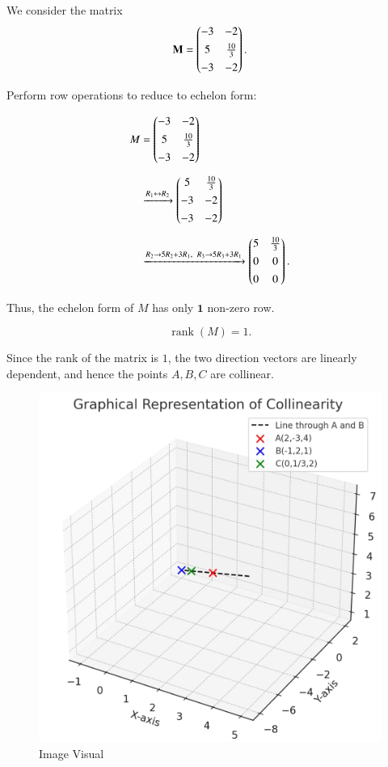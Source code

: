 \documentclass[journal]{IEEEtran}
\begin{document}
We consider the matrix
\begin{equation}
\mathbf{M} = \begin{pmatrix} -3 & -2 \\[4pt] 5 & \tfrac{10}{3} \\[4pt] -3 & -2 \end{pmatrix}.
\label{eq:M}
\end{equation}

Perform row operations to reduce to echelon form:

\[
\begin{aligned}
M &= \begin{pmatrix} -3 & -2 \\[4pt] 5 & \tfrac{10}{3} \\[4pt] -3 & -2 \end{pmatrix} \\[6pt]
&\xrightarrow{R_1 \leftrightarrow R_2}
\begin{pmatrix} 5 & \tfrac{10}{3} \\[4pt] -3 & -2 \\[4pt] -3 & -2 \end{pmatrix} \\[6pt]
&\xrightarrow{R_2 \to 5R_2+3R_1,\;\; R_3 \to 5R_3+3R_1}
\begin{pmatrix} 5 & \tfrac{10}{3} \\[4pt] 0 & 0 \\[4pt] 0 & 0 \end{pmatrix}.
\end{aligned}
\]

Thus, the echelon form of \(M\) has only \(\mathbf{1}\) non-zero row.

\begin{equation}
\operatorname{rank}(M) = 1.
\label{eq:rank}
\end{equation}

Since the rank of the matrix is \(1\), the two direction vectors are linearly dependent, and hence the points \(A,B,C\) are collinear.


\begin{figure}[H]
    \centering
    \includegraphics[width=0.6\linewidth]{figs/image.png}
    \caption{Image Visual}
    \label{fig:figs/image.png}
\end{figure}
\end{document}
